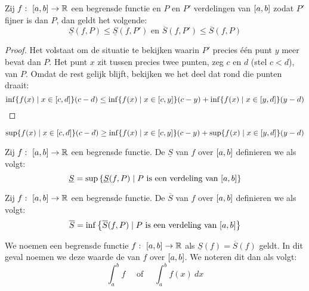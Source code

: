 \documentclass[main.tex]{subfiles}
\begin{document}
\begin{bpr}
  Zij $f:\ \interval{a}{b} \rightarrow \mathbb{R}$ een begrensde functie en $P$ en $P'$ verdelingen van $\interval{a}{b}$ zodat $P'$ fijner is dan $P$, dan geldt het volgende:
  \[ \underline{S}(f,P) \le \underline{S}(f,P') \text{ en } \overline{S}(f,P') \le \overline{S}(f,P) \]

  \begin{proof}
    Het volstaat om de situatie te bekijken waarin $P'$ precies \'e\'en punt $y$ meer bevat dan $P$.
    Het punt $x$ zit tussen precies twee punten, zeg $c$ en $d$ (stel $c<d$), van $P$.
    Omdat de rest gelijk blijft, bekijken we het deel dat rond die punten draait:
    \[ \inf\{ f(x) \mid x\in \interval{c}{d}\} (c-d) \le \inf\{ f(x) \mid x\in \interval{c}{y}\} (c-y) + \inf\{ f(x) \mid x\in \interval{y}{d}\} (y-d)\]
  \end{proof}
    \[ \sup\{ f(x) \mid x\in \interval{c}{d}\} (c-d) \ge \inf\{ f(x) \mid x\in \interval{c}{y}\} (c-y) + \sup\{ f(x) \mid x\in \interval{y}{d}\} (y-d)\]
\end{bpr}

\begin{de}
  Zij $f:\ \interval{a}{b} \rightarrow \mathbb{R}$ een begrensde functie.
  De  $\underline{S}$ van $f$ over $\interval{a}{b}$ definieren we als volgt:
  \[ \underline{S} = \sup\left\{\underline{S}(f,P) \mid P \text{ is een verdeling van } \interval{a}{b} \right\} \]
\end{de}

\begin{de}
  Zij $f:\ \interval{a}{b} \rightarrow \mathbb{R}$ een begrensde functie.
  De  $\overline{S}$ van $f$ over $\interval{a}{b}$ definieren we als volgt:
  \[ \overline{S} = \inf\left\{\overline{S}(f,P) \mid P \text{ is een verdeling van } \interval{a}{b} \right\} \]
\end{de}

\begin{de}
  We noemen een begrensde functie $f:\ \interval{a}{b} \rightarrow \mathbb{R}$  als $\underline{S}(f) = \overline{S}(f)$ geldt.
  In dit geval noemen we deze waarde de  van $f$ over $\interval{a}{b}$.
  We noteren dit dan als volgt:
  \[ \int_{a}^{b}f \quad\text{ of }\quad \int_{a}^{b}f(x)\ dx \]
\end{de}
\end{document}
